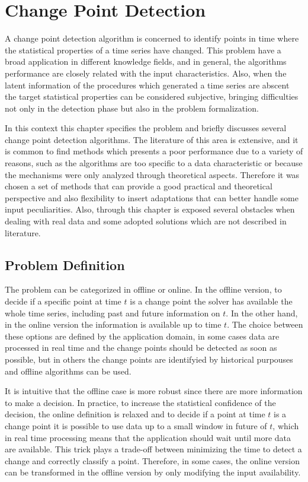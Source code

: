 \chapter{Change Point Detection} 

A change point detection algorithm is concerned to identify points in time where the statistical properties of a time series have changed. This problem have a broad application in different knowledge fields, and in general, the algorithms performance are closely related with the input characteristics. Also, when the latent information of the procedures which generated a time series are abscent the target statistical properties can be considered subjective, bringing difficulties not only in the detection phase but also in the problem formalization.

In this context this chapter specifies the problem and briefly discusses several change point detection algorithms. The literature of this area is extensive, and it is common to find methods which presents a poor performance due to a variety of reasons, such as the algorithms are too specific to a data characteristic or because the mechanisms were only analyzed through theoretical aspects. Therefore it was chosen a set of methods that can provide a good practical and theoretical perspective and also flexibility to insert adaptations that can better handle some input peculiarities. Also, through this chapter is exposed several obstacles when dealing with real data and some adopted solutions which are not described in literature.

\section{Problem Definition}

The problem can be categorized in offline or online. In the offline version, to decide if a specific point at time $t$ is a change point the solver has available the whole time series, including past and future information on $t$. In the other hand, in the online version the information is available up to time $t$. The choice between these options are defined by the application domain, in some cases data are processed in real time and the change points should be detected as soon as possible, but in others the change points are identifyied by historical purpouses and offline algorithms can be used. 

It is intuitive that the offline case is more robust since there are more information to make a decision. In practice, to increase the statistical confidence of the decision, the online definition is relaxed and to decide if a point at time $t$ is a change point it is possible to use data up to a small window in future of $t$, which in real time processing means that the application should wait until more data are available. This trick plays a trade-off between minimizing the time to detect a change and correctly classify a point. Therefore, in some cases, the online version can be transformed in the offline version by only modifying the input availability. 

